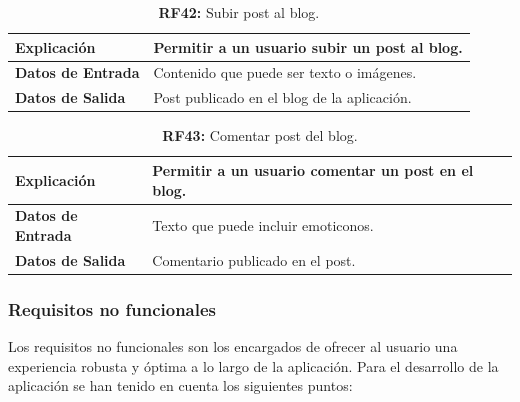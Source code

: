 \documentclass[a4paper, 12pt]{article}
\begin{document}
\begin{table}[H]
\captionsetup{justification=raggedright,singlelinecheck=false}
\caption{\textbf{RF42:} Subir post al blog.}
\label{tab:RF42}
	\begin{tabular}{|m{5cm}|m{10cm}|}
	\hline
	\textbf{Explicación} & Permitir a un usuario subir un post al blog. \\ 
	\hline
	\textbf{Datos de Entrada} & Contenido que puede ser texto o imágenes. \\ 
	\hline
	\textbf{Datos de Salida} & Post publicado en el blog de la aplicación. \\ 
	\hline
\end{tabular}
\end{table}

\begin{table}[H]
\captionsetup{justification=raggedright,singlelinecheck=false}
\caption{\textbf{RF43:} Comentar post del blog.}
\label{tab:RF43}
	\begin{tabular}{|m{5cm}|m{10cm}|}
	\hline
	\textbf{Explicación} & Permitir a un usuario comentar un post en el blog. \\ 
	\hline
	\textbf{Datos de Entrada} & Texto que puede incluir emoticonos. \\ 
	\hline
	\textbf{Datos de Salida} & Comentario publicado en el post. \\ 
	\hline
\end{tabular}
\end{table}


\subsubsection{Requisitos no funcionales}

Los requisitos no funcionales son los encargados de ofrecer al usuario una experiencia robusta y óptima a lo largo de la aplicación. Para el desarrollo de la aplicación se han tenido en cuenta los siguientes puntos:
\end{document}
